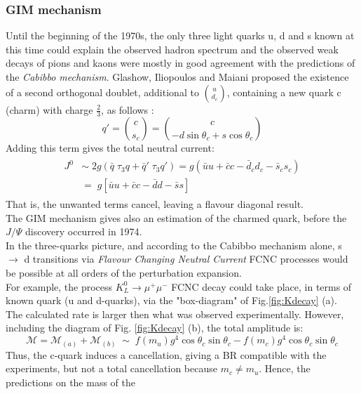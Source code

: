\subsubsection{GIM mechanism}
Until the beginning of the 1970s, the only three light quarks u, d and s known at this time could explain the observed hadron spectrum and the observed weak decays of pions
and kaons were mostly in good agreement with the predictions of the \textit{Cabibbo mechanism}.
Glashow, Iliopoulos and Maiani proposed the existence of a second orthogonal doublet, additional to $\binom{u}{d_c}$,  containing a new quark c (charm) with charge $\frac{2}{3}$, as follows \cite{gim}:
\begin{equation} 
q' = \binom{c}{s_c} = \binom{c}{-d\sin\theta_{c}+s\cos\theta_c}
\end{equation}
Adding this term gives the total neutral current:
\begin {align}
\begin{split}
	J^{0} & \sim \; 2g (\bar{q} \; \tau_{3}q+ \bar{q}' \; \tau_{3}q')  = g(\bar{u} u + \bar{c}c - \bar{d}_{c} d_{c}- \bar{s}_{c} s_{c}) \\
	& = \; g[ \bar{u} u + \bar{c}c - \bar{d} d  - \bar{s}s ]
\end{split}						
\end{align}
That is, the unwanted terms cancel, leaving a flavour diagonal result.
\vspace{\baselineskip}
\\The GIM mechanism gives also an estimation of the charmed quark, before the $J/\Psi$ discovery occurred in 1974.\\
In the three-quarks picture, and according to the Cabibbo mechanism alone, s $\rightarrow$ d transitions via \textit{Flavour Changing Neutral Current} FCNC processes would be possible at all orders of the perturbation expansion. \\
For example, the process $K^{0}_{L}\rightarrow \mu^{+} \mu^{-}$ FCNC decay could take place, in terms of known quark (u and d-quarks), via the "box-diagram" of Fig.\ref{fig:Kdecay} (a).\\
The calculated rate is larger then what was observed experimentally. However, including the diagram of Fig. \ref{fig:Kdecay} (b), the total amplitude is:
\begin{equation} 
\mathcal{M} = \mathcal{M}_{(a)} +\mathcal{M}_{(b)} \;\sim\;f(m_u)g^{4}\cos\theta_{c}\sin\theta_{c} - f(m_c)g^{4}\cos\theta_{c}\sin\theta_{c}
\end{equation}
Thus, the c-quark induces a cancellation, giving a BR compatible with the experiments, but not a total cancellation because $m_{c}\neq m_{u}$. Hence, the predictions on the mass of the
